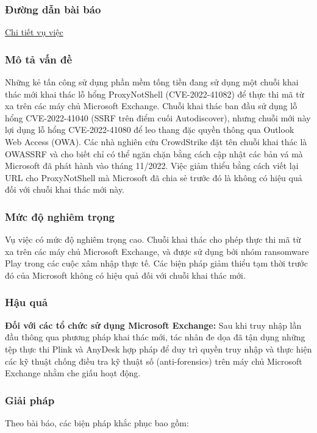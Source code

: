 \subsubsection{Đường dẫn bài báo}
\href{https://vjst.vn/chuoi-khai-thac-moi-trong-microsoft-exchange-55285.html}{Chi tiết vụ việc}

\subsubsection{Mô tả vấn đề}
Những kẻ tấn công sử dụng phần mềm tống tiền đang sử dụng một chuỗi khai thác mới khai thác lỗ hổng ProxyNotShell (CVE-2022-41082) để thực thi mã từ xa trên các máy chủ Microsoft Exchange. Chuỗi khai thác ban đầu sử dụng lỗ hổng CVE-2022-41040 (SSRF trên điểm cuối Autodiscover), nhưng chuỗi mới này lợi dụng lỗ hổng CVE-2022-41080 để leo thang đặc quyền thông qua Outlook Web Access (OWA). Các nhà nghiên cứu CrowdStrike đặt tên chuỗi khai thác là OWASSRF và cho biết chỉ có thể ngăn chặn bằng cách cập nhật các bản vá mà Microsoft đã phát hành vào tháng 11/2022. Việc giảm thiểu bằng cách viết lại URL cho ProxyNotShell mà Microsoft đã chia sẻ trước đó là không có hiệu quả đối với chuỗi khai thác mới này.

\subsubsection{Mức độ nghiêm trọng}
Vụ việc có mức độ nghiêm trọng cao. Chuỗi khai thác cho phép thực thi mã từ xa trên các máy chủ Microsoft Exchange, và được sử dụng bởi nhóm ransomware Play trong các cuộc xâm nhập thực tế. Các biện pháp giảm thiểu tạm thời trước đó của Microsoft không có hiệu quả đối với chuỗi khai thác mới.

\subsubsection{Hậu quả}
\textbf{Đối với các tổ chức sử dụng Microsoft Exchange:} Sau khi truy nhập lần đầu thông qua phương pháp khai thác mới, tác nhân đe dọa đã tận dụng những tệp thực thi Plink và AnyDesk hợp pháp để duy trì quyền truy nhập và thực hiện các kỹ thuật chống điều tra kỹ thuật số (anti-forensics) trên máy chủ Microsoft Exchange nhằm che giấu hoạt động.

\subsubsection{Giải pháp}
Theo bài báo, các biện pháp khắc phục bao gồm:

